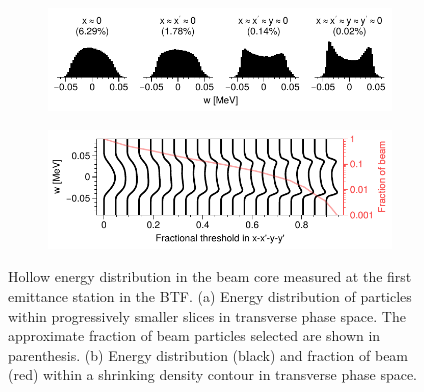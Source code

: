 \documentclass[letterpaper,
               nospread,
               biblatex,
              ]{jacow}
\begin{document}
\begin{figure}[!t]
    \centering
    \begin{subfigure}{\columnwidth}
        \includegraphics[width=\textwidth]{FRXD3f1a.pdf}
        \caption{}
        \label{fig:hollow_a}
    \end{subfigure}
    \begin{subfigure}{\columnwidth}
        \includegraphics[width=\textwidth]{FRXD3f1b.pdf}
        \caption{}
        \label{fig:hollow_b}
    \end{subfigure}
    \caption{Hollow energy distribution in the beam core measured at the first emittance station in the BTF. (a) Energy distribution of particles within progressively smaller slices in transverse phase space. The approximate fraction of beam particles selected are shown in parenthesis. (b) Energy distribution (black) and fraction of beam (red) within a shrinking density contour in transverse phase space.}
    \label{fig:hollow}
\end{figure}
%
\end{document}
